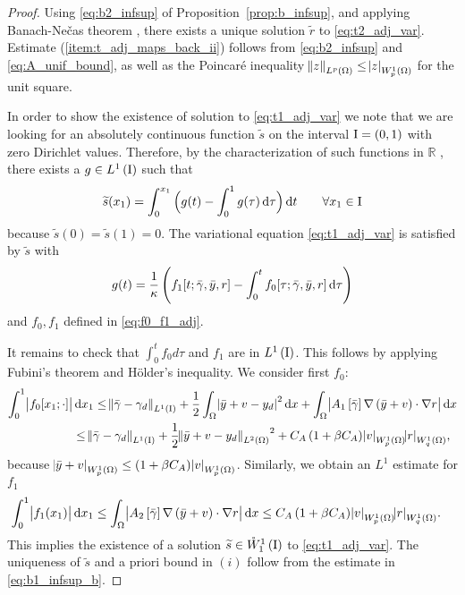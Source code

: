 \documentclass[final]{siamltex}
\begin{document}
\begin{proof}
Using \eqref{eq:b2_infsup} of Proposition~\ref{prop:b_infsup}, and
applying Banach-Ne\v{c}as theorem 
\cite{AErn_JLGuermond_2004a}, there exists a unique solution ${\widetilde{r}}$ to \eqref{eq:t2_adj_var}. 
Estimate (\ref{item:t_adj_maps_back_ii}) follows from \eqref{eq:b2_infsup} and \eqref{eq:A_unif_bound}, as well as 
the Poincar\'e inequality $\norm{z}_{L^p(\Omega)} \le {\abs{{z}}_{{W^{{{1}}}_{{{p}}}\del{{{\Omega}}}}}}$ for the unit square. 

In order to show the existence of solution to \eqref{eq:t1_adj_var}  we note that we are looking for an absolutely 
continuous function $\widetilde{s}$ on the interval ${\text{\rm I}}=\intoo{0,1}$ with zero Dirichlet values. Therefore, by the characterization of 
such functions in ${\mathbb{R}}$ \cite[Theorem 5.14]{HRoyden_1988}, there exists a $g \in {{L^1\del{\text{\rm I}}}}$
such that
	\[
		{\widetilde{s}}(x_1) = \int_0^{x_1} \Big( g(t)- \int_0^1 g(\tau) \dif \tau \Big) \dif t 
			\qquad \forall x_1 \in {\text{\rm I}}
	\]
because ${\widetilde{s}}(0) = {\widetilde{s}}(1) = 0$. The variational equation
\eqref{eq:t1_adj_var} is satisfied by ${\widetilde{s}}$ with
	\[
        g(t) = \frac{1}{\kappa} \del{f_1[t;{\bar{\gamma}}, {\bar{y}}, r] -
            \int_0^t f_0[\tau; {\bar{\gamma}}, {\bar{y}}, r]\dif\tau} 
	\]
and $f_0, f_1$ defined in \eqref{eq:f0_f1_adj}. 

It remains to check that $\int_0^t f_0 d \tau$ 
and $f_1$ are in ${{L^1\del{\text{\rm I}}}}$. This follows by applying Fubini's
theorem and H\"older's inequality. We consider first $f_0$:
\begin{align*}
	\int_0^1 \abs{f_0[x_1;\cdot]} & \dif x_1 
		 \leq  \norm{{\bar{\gamma}} - \gamma_d}_{{{L^1\del{\text{\rm I}}}}} 
		 + \frac{1}{2}\int_\Omega \abs{{\bar{y}}+v-y_d}^2 \dif x 
			+ \int_\Omega \abs{A_1\sbr{\bar{\gamma}}{\nabla}\del{{\bar{y}}+v}\cdot{\nabla} r} \dif x \\
		&\leq  \norm{{\bar{\gamma}} - \gamma_d}_{{{L^1\del{\text{\rm I}}}}} 
		 + \frac{1}{2}{\norm{{{\bar{y}}+v-y_d}}_{{L^2\del{{\Omega}}}}}^2
			+  C_A \del{1+\beta C_A}{\abs{{v}}_{{W^{{1}}_{{p}}\del{{\Omega}}}}}{\abs{{r}}_{{W^{{{1}}}_{{{q}}}\del{{{\Omega}}}}}} ,
\end{align*}
because ${\abs{{{\bar{y}}+v}}_{{W^{{{1}}}_{{{p}}}\del{{{\Omega}}}}}} \le \del{1+\beta C_A} {\abs{{v}}_{{W^{{{1}}}_{{{p}}}\del{{{\Omega}}}}}}$.
Similarly, we obtain an $L^1$ estimate for $f_1$
\begin{align*}
	\int_0^1 \abs{f_1(x_1)}\dif x_1
		&\leq \int_\Omega \abs{A_2\sbr{\bar{\gamma}}{\nabla} \del{{\bar{y}}+v} \cdot {\nabla} r}  \dif x 
		 \le  C_A \del{1+\beta C_A} {\abs{{v}}_{{W^{{{1}}}_{{{p}}}\del{{{\Omega}}}}}} {\abs{{r}}_{{W^{{{1}}}_{{{q}}}\del{{{\Omega}}}}}} .
\end{align*}
This implies the existence of a solution $\widetilde{s} \in {{\mathring{W}^{1}_{1}\del{{\text{\rm I}}}}}$ to \eqref{eq:t1_adj_var}. The uniqueness of $\widetilde{s}$ and a priori bound in $(i)$ follow from
the estimate in \eqref{eq:b1_infsup_b}.
\end{proof}
\end{document}
